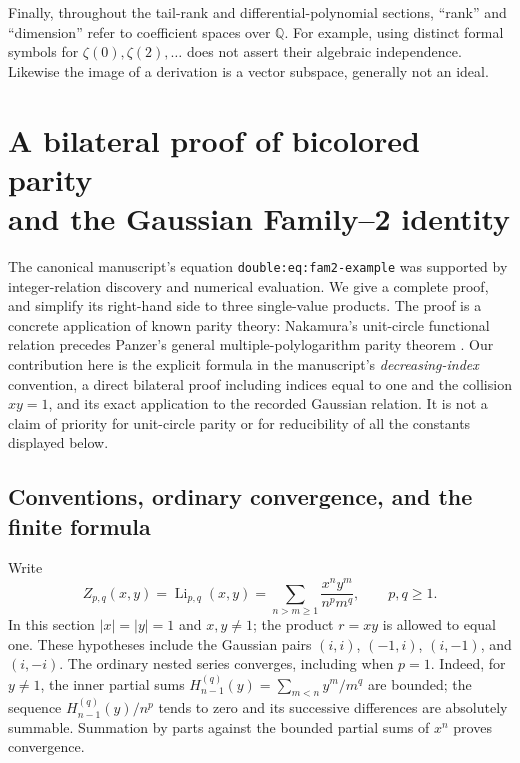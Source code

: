 \documentclass[11pt,a4paper]{article}
\numberwithin{equation}{section}
\theoremstyle{definition}
\theoremstyle{remark}
\DeclareMathOperator{\Li}{Li}
\newcommand{\Q}{\mathbb Q}
\begin{document}
Finally, throughout the tail-rank and differential-polynomial sections,
``rank'' and ``dimension'' refer to coefficient spaces over $\Q$.
For example, using distinct formal symbols for $\zeta(0),\zeta(2),\ldots$
does not assert their algebraic independence.  Likewise the image of a
derivation is a vector subspace, generally not an ideal.



\section[A bilateral proof of bicolored parity and the Gaussian Family--2 identity]{A bilateral proof of bicolored parity\\and the Gaussian Family--2 identity}
\label{bip:sec:main}

The canonical manuscript's equation \texttt{double:eq:fam2-example}
was supported by integer-relation discovery and numerical evaluation.
We give a complete proof, and simplify its right-hand side to three
single-value products.  The proof is a concrete application of known
parity theory: Nakamura's unit-circle functional relation
\cite[Proposition~1.2]{bip:Nakamura2012} precedes Panzer's general
multiple-polylogarithm parity theorem \cite[Theorem~1.3 and (3.2)]{bip:Panzer2017}.
Our contribution here is the explicit formula in the manuscript's
\emph{decreasing-index} convention, a direct bilateral proof including
indices equal to one and the collision $xy=1$, and its exact application
to the recorded Gaussian relation.  It is not a claim of priority for
unit-circle parity or for reducibility of all the constants displayed below.

\subsection{Conventions, ordinary convergence, and the finite formula}
Write
\[
 Z_{p,q}(x,y)=\Li_{p,q}(x,y)
 =\sum_{n>m\ge1}\frac{x^ny^m}{n^pm^q},\qquad p,q\ge1.
\]
In this section $|x|=|y|=1$ and $x,y\ne1$; the product $r=xy$ is
allowed to equal one.  These hypotheses include the Gaussian pairs
$(i,i)$, $(-1,i)$, $(i,-1)$, and $(i,-i)$.
The ordinary nested series converges, including when $p=1$.
Indeed, for $y\ne1$, the inner partial sums
$H_{n-1}^{(q)}(y)=\sum_{m<n}y^m/m^q$ are bounded; the sequence
$H_{n-1}^{(q)}(y)/n^p$ tends to zero and its successive differences
are absolutely summable.  Summation by parts against the bounded
partial sums of $x^n$ proves convergence.
\end{document}
